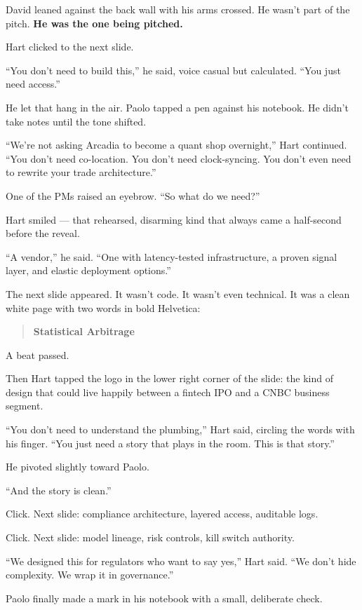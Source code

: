 \medskip

David leaned against the back wall with his arms crossed. He wasn’t part of the pitch. \textbf{He was the one being pitched.}

Hart clicked to the next slide.

``You don’t need to build this,'' he said, voice casual but calculated.  
``You just need access.''

He let that hang in the air. Paolo tapped a pen against his notebook. He didn’t take notes 
until the tone shifted.

``We’re not asking Arcadia to become a quant shop overnight,'' Hart continued.  
``You don’t need co-location. You don’t need clock-syncing. You don’t even need to rewrite your trade architecture.''

One of the PMs raised an eyebrow. “So what do we need?”

Hart smiled — that rehearsed, disarming kind that always came a half-second before the reveal.

``A vendor,'' he said. ``One with latency-tested infrastructure, a proven signal layer, and elastic deployment options.''

The next slide appeared. It wasn’t code. It wasn’t even technical.  
It was a clean white page with two words in bold Helvetica:

\begin{quote}
\centering
\textbf{Statistical Arbitrage}
\end{quote}

A beat passed.

Then Hart tapped the logo in the lower right corner of the slide:  the kind of 
design that could live happily between a fintech IPO and a CNBC business segment.

``You don’t need to understand the plumbing,'' Hart said, circling the words with his finger.  
``You just need a story that plays in the room. This is that story.''

He pivoted slightly toward Paolo.

``And the story is clean.''

Click. Next slide: compliance architecture, layered access, auditable logs.  

Click. Next slide: model lineage, risk controls, kill switch authority.

``We designed this for regulators who want to say yes,'' Hart said. ``We don’t hide complexity. We wrap it in governance.''

Paolo finally made a mark in his notebook with a small, deliberate check. 


